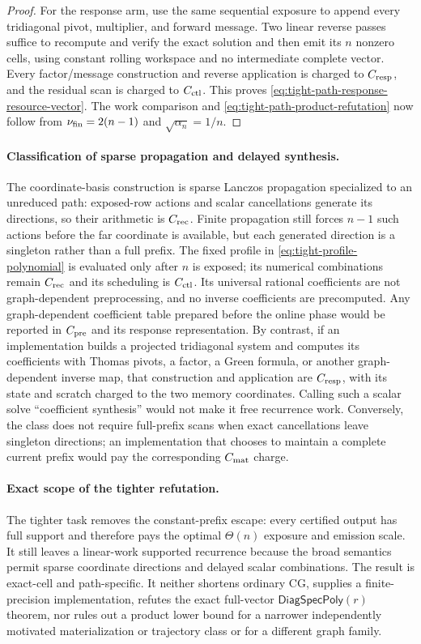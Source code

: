\begin{proof}
For the response arm, use the same sequential exposure to append every
tridiagonal pivot, multiplier, and forward message.  Two linear reverse
passes suffice to recompute and verify the exact solution and then emit its
$n$ nonzero cells, using constant rolling workspace and no intermediate
complete vector.  Every factor/message construction and reverse application
is charged to $C_{\rm resp}$, and the residual scan is charged to
$C_{\rm ctl}$.  This proves
\cref{eq:tight-path-response-resource-vector}.  The work comparison and
\cref{eq:tight-path-product-refutation} now follow from
$\nu_{\rm fin}=2(n-1)$ and $\sqrt{\alpha_n}=1/n$.
\end{proof}

\paragraph{Classification of sparse propagation and delayed synthesis.}
The coordinate-basis construction is sparse Lanczos propagation specialized
to an unreduced path: exposed-row actions and scalar cancellations generate
its directions, so their arithmetic is $C_{\rm rec}$.  Finite propagation
still forces $n-1$ such actions before the far coordinate is available, but
each generated direction is a singleton rather than a full prefix.  The fixed
profile in
\cref{eq:tight-profile-polynomial} is evaluated only after $n$ is exposed;
its numerical combinations remain $C_{\rm rec}$ and its scheduling is
$C_{\rm ctl}$.  Its universal rational coefficients are not graph-dependent
preprocessing, and no inverse coefficients are precomputed.  Any
graph-dependent coefficient table prepared before the online phase would be
reported in $C_{\rm pre}$ and its response representation.  By contrast, if an
implementation builds a projected tridiagonal system and computes its
coefficients with Thomas pivots, a factor, a Green formula, or another
graph-dependent inverse map, that construction and application are
$C_{\rm resp}$, with its state and scratch charged to the two memory
coordinates.  Calling such a scalar solve ``coefficient synthesis'' would
not make it free recurrence work.  Conversely, the class does not require
full-prefix scans when exact cancellations leave singleton directions; an
implementation that chooses to maintain a complete current prefix would pay
the corresponding $C_{\rm mat}$ charge.

\paragraph{Exact scope of the tighter refutation.}
The tighter task removes the constant-prefix escape: every certified output
has full support and therefore pays the optimal $\Theta(n)$ exposure and
emission scale.  It still leaves a linear-work supported recurrence because
the broad semantics permit sparse coordinate directions and delayed scalar
combinations.  The result is exact-cell and path-specific.  It neither
shortens ordinary CG, supplies a finite-precision implementation, refutes the
exact full-vector $\mathsf{DiagSpecPoly}(r)$ theorem, nor rules out a product
lower bound for a narrower independently motivated materialization or
trajectory class or for a different graph family.
